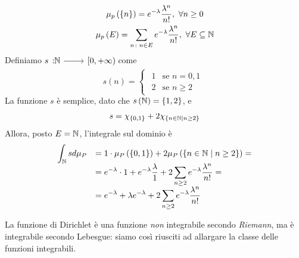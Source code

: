 \begin{examples}
\begin{enumerate}
\begin{gather}
	\mu_p\left(\left\{n\right\}\right)=e^{-\lambda}\frac{\lambda^n}{n!},\ \forall n\geq 0\\
	\mu_p\left(E\right)=\sum_{n\colon n\in E}e^{-\lambda}\frac{\lambda^n}{n!},\ \forall E\subseteq \naturalset
\end{gather}
Definiamo $\funz{s}{\naturalset}{\left[0,+\infty\right)}$ come
\begin{equation*}
	s\left(n\right)=\begin{cases}
		\begin{array}{ll}
			1&\text{se }n=0,1\\
			2&\text{se }n\geq 2
		\end{array}
	\end{cases}
\end{equation*}
La funzione $s$ è semplice, dato che $s\left(\mathbb{N}\right)=\left\{1,2\right\}$, e
\begin{equation*}
	s=\chi_{\left\{0,1\right\}}+2\chi_{\left\{n\in\mathbb{N}\mid n\geq 2\right\}}
\end{equation*}
Allora, posto $E=\mathbb{N}$, l'integrale sul dominio è
\begin{equation*}
\begin{array}{ll}
	\displaystyle\int_{\mathbb{N}}sd\mu_P&=1\cdot \mu_P\left(\left\{0,1\right\}\right)+2\mu_P\left(\left\{n\in\mathbb{N}\mid n\geq 2\right\}\right)=\\
	&\displaystyle=e^{-\lambda}\cdot 1+e^{-\lambda}\frac{\lambda}{1}+2\sum_{n\geq 2}e^{-\lambda}\frac{\lambda^n}{n!}=\\
	&\displaystyle=e^{-\lambda}+\lambda e^{-\lambda}+2\sum_{n\geq 2}e^{-\lambda}\frac{\lambda^n}{n!}
\end{array}
\end{equation*}
	\end{enumerate}
\end{examples}
\begin{observe}
	La funzione di Dirichlet è una funzione \textit{non} integrabile secondo \textit{Riemann}, ma è integrabile secondo Lebesgue: siamo così riusciti ad allargare la classe delle funzioni integrabili.
\end{observe}
